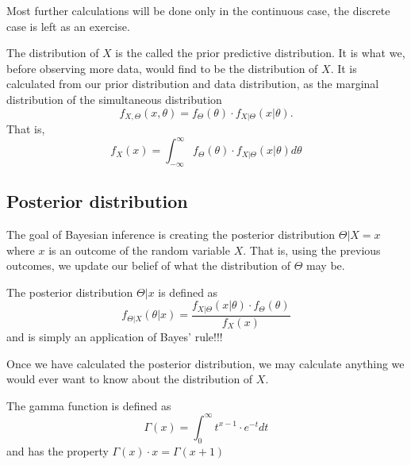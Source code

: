 \begin{obs}
	Most further calculations will be done only in the continuous case, the discrete case is left as an exercise.
\end{obs}


\begin{definition}
	The distribution of \(X\) is the called the prior predictive distribution. It is what we, before observing more data, would find to be the distribution of \(X\). It is calculated from our prior distribution and data distribution, as the marginal distribution of the simultaneous distribution 
	\[
		f_{X, \Theta }(x,\theta) = f_\Theta(\theta )  \cdot f _{X|\Theta }(x|\theta ).
	\]
	That is,
	\[
		f_X(x) = \int_{-\infty }^{\infty} f_\Theta(\theta )  \cdot f _{X|\Theta }(x|\theta ) d \theta 
	\]
	
\end{definition}


\subsection{Posterior distribution}
The goal of Bayesian inference is creating the posterior distribution \(\Theta | X=x \) where \(x \) is an outcome of the random variable \(X\). That is, using the previous outcomes, we update our belief of what the distribution of \(\Theta \) may be.

\begin{definition} %
	The posterior distribution \(\Theta |x\) is defined as
	\[
		f _{\Theta |X}(\theta |x) = \frac{f _{X|\Theta}(x|\theta )  \cdot f_\Theta (\theta )}{f_X(x)} 
	\]
	and is simply an application of Bayes' rule!!!
\end{definition}

\begin{obs}
	Once we have calculated the posterior distribution, we may calculate anything we would ever want to know about the distribution of \(X\).
\end{obs}

\begin{obs}
	The gamma function is defined as 
	\[
		\Gamma(x) = \int_{0}^{\infty} t^{x-1} \cdot e^{-t}dt
	\]
	and has the property \(\Gamma(x)  \cdot x = \Gamma(x+1)\) 
\end{obs}


